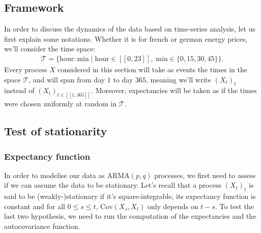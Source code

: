 
\newcommand{\T}{\mathcal{T}}
\newcommand{\Cov}{\mathrm{Cov}}
\newcommand{\ARMA}{\mathrm{ARMA}}
\newcommand{\ARIMA}{\mathrm{ARIMA}}
\newcommand{\AR}{\mathrm{AR}}
\newcommand{\GARCH}{\mathrm{GARCH}}
\newcommand{\ARCH}{\mathrm{ARCH}}
\newcommand{\entFF}[2]{[\![ #1, #2 ]\!]}
\newcommand{\N}{\mathbb{N}}
\newcommand{\code}[1]{\texttt{#1}}
\newcommand{\Z}{\mathbb{Z}}

\subsection{Framework}

In order to discuss the dynamics of the data based on time-series analysis, let us first explain some notations. Whether it is for french or german energy prices, we'll consider the time space:
\begin{align*}
\T = \{ \mathrm{hour}\!:\!\mathrm{min} \mid \mathrm{hour} \in \entFF{0}{23}, \; \mathrm{min} \in \{0, 15, 30, 45\}\}.
\end{align*}
Every process $X$ considered in this section will take as events the times in the space $\T$, and will span from day $1$ to day $365$, meaning we'll write $(X_t)_t$ instead of $(X_t)_{t \in \entFF{1}{365}}$. Moreover, expectancies will be taken as if the times were chosen uniformly at random in $\T$.

\subsection{Test of stationarity}

\subsubsection{Expectancy function}

In order to modelise our data as $\ARMA(p,q)$ processes, we first need to assess if we can assume the data to be stationary. Let's recall that a process $(X_t)_t$ is said to be (weakly-)stationary if it's square-integrable, its expectancy function is constant and for all $0 \leq s \leq t$, $\Cov(X_s, X_t)$ only depends on $t-s$. To test the last two hypothesis, we need to run the computation of the expectancies and the autocovariance function.

